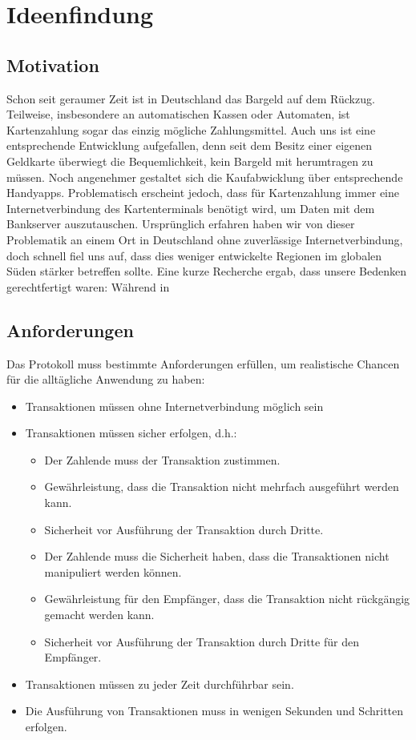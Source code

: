 \chapter{Ideenfindung}\label{ch:einleitung}
    \section{Motivation}
    Schon seit geraumer Zeit ist in Deutschland das Bargeld auf dem Rückzug.
    Teilweise, insbesondere an automatischen Kassen oder Automaten, ist Kartenzahlung sogar das einzig mögliche Zahlungsmittel.
    Auch uns ist eine entsprechende Entwicklung aufgefallen, denn seit dem Besitz einer eigenen Geldkarte überwiegt die Bequemlichkeit, kein Bargeld mit herumtragen zu müssen.
    Noch angenehmer gestaltet sich die Kaufabwicklung über entsprechende Handyapps.
    Problematisch erscheint jedoch, dass für Kartenzahlung immer eine Internetverbindung des Kartenterminals benötigt wird, um Daten mit dem Bankserver auszutauschen.
    Ursprünglich erfahren haben wir von dieser Problematik an einem Ort in Deutschland ohne zuverlässige Internetverbindung, doch schnell fiel uns auf, dass dies weniger entwickelte Regionen im globalen Süden stärker betreffen sollte.
    Eine kurze Recherche ergab, dass unsere Bedenken gerechtfertigt waren:
    Während in

    \section{Anforderungen}
    Das Protokoll muss bestimmte Anforderungen erfüllen, um realistische Chancen für die alltägliche Anwendung zu haben:
    \begin{itemize}
        \item Transaktionen müssen ohne Internetverbindung möglich sein
        \item Transaktionen müssen sicher erfolgen, d.h.:
        \begin{itemize}
            \item Der Zahlende muss der Transaktion zustimmen.
            \item Gewährleistung, dass die Transaktion nicht mehrfach ausgeführt werden kann.
            \item Sicherheit vor Ausführung der Transaktion durch Dritte.
            \item Der Zahlende muss die Sicherheit haben, dass die Transaktionen nicht manipuliert werden können.
            
            \item Gewährleistung für den Empfänger, dass die Transaktion nicht rückgängig gemacht werden kann.
            \item Sicherheit vor Ausführung der Transaktion durch Dritte für den Empfänger.
        \end{itemize}

        \item Transaktionen müssen zu jeder Zeit durchführbar sein.
        \item Die Ausführung von Transaktionen muss in wenigen Sekunden und Schritten erfolgen.
    \end{itemize}